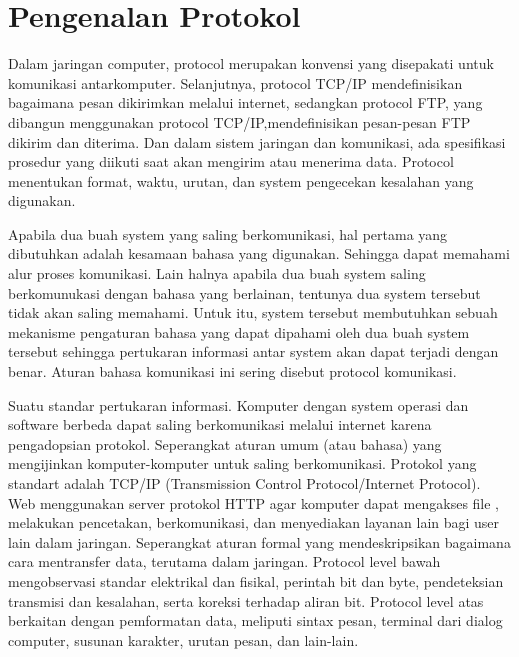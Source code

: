
\section{Pengenalan Protokol} 

Dalam jaringan computer, protocol merupakan konvensi yang disepakati untuk komunikasi antarkomputer. Selanjutnya, protocol TCP/IP 
mendefinisikan bagaimana pesan dikirimkan melalui internet, sedangkan protocol FTP, yang dibangun menggunakan protocol TCP/IP,mendefinisikan pesan-pesan FTP dikirim dan diterima. Dan dalam sistem jaringan dan komunikasi, ada spesifikasi prosedur yang diikuti saat akan mengirim atau menerima data. Protocol menentukan format, waktu, urutan, dan system pengecekan kesalahan yang digunakan.

Apabila dua buah system yang saling berkomunikasi, hal pertama yang dibutuhkan adalah kesamaan bahasa yang digunakan. Sehingga dapat 
memahami alur proses komunikasi. Lain halnya apabila dua buah system saling berkomunukasi dengan bahasa yang berlainan, tentunya dua 
system tersebut tidak akan saling memahami. Untuk itu, system tersebut membutuhkan sebuah mekanisme pengaturan bahasa yang dapat 
dipahami oleh dua buah system tersebut sehingga pertukaran informasi antar system akan dapat terjadi dengan benar. Aturan bahasa 
komunikasi ini sering disebut protocol komunikasi. 
 
Suatu standar pertukaran informasi. Komputer dengan system operasi dan software berbeda dapat saling berkomunikasi melalui internet 
karena pengadopsian protokol. Seperangkat aturan umum (atau bahasa) yang mengijinkan komputer-komputer untuk saling berkomunikasi. 
Protokol yang standart adalah TCP/IP (Transmission Control Protocol/Internet Protocol). Web menggunakan server protokol HTTP agar 
komputer dapat mengakses file , melakukan pencetakan, berkomunikasi, dan menyediakan layanan lain bagi user lain dalam jaringan.    
 Seperangkat aturan formal yang mendeskripsikan bagaimana cara mentransfer data, terutama dalam jaringan. Protocol level bawah
 mengobservasi standar elektrikal dan fisikal, perintah bit dan byte, pendeteksian transmisi dan kesalahan, serta koreksi terhadap 
 aliran bit. Protocol level atas berkaitan dengan pemformatan data, meliputi sintax pesan, terminal dari dialog computer, susunan 
 karakter, urutan pesan, dan lain-lain.
 
